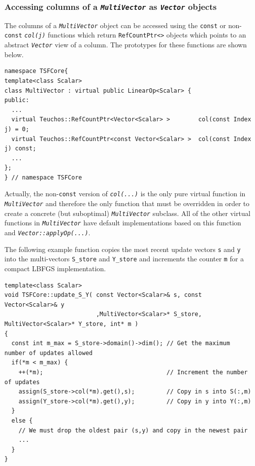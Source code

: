 %
\subsubsection{Accessing columns of a {}\texttt{\textit{Multi\-Vector}}
as {}\texttt{\textit{Vector}} objects}
%

The columns of a {}\texttt{\textit{Multi\-Vector}} object can be
accessed using the {}\texttt{const} or non-\texttt{const}
{}\texttt{\textit{col(j)}} functions which return
{}\texttt{RefCountPtr<>} objects which points to an abstract
{}\texttt{\textit{Vector}} view of a column.  The prototypes for these
functions are shown below.

{\scriptsize\begin{verbatim}
namespace TSFCore{
template<class Scalar>
class MultiVector : virtual public LinearOp<Scalar> {
public:
  ...
  virtual Teuchos::RefCountPtr<Vector<Scalar> >        col(const Index j) = 0;
  virtual Teuchos::RefCountPtr<const Vector<Scalar> >  col(const Index j) const;
  ...
};
} // namespace TSFCore
\end{verbatim}}

{}\noindent{}Actually, the non-\texttt{const} version of
{}\texttt{\textit{col(...)}}  is the only pure virtual function in
{}\texttt{\textit{Multi\-Vector}} and therefore the only function that
must be overridden in order to create a concrete (but suboptimal)
{}\texttt{\textit{Multi\-Vector}} subclass.  All of the other virtual
functions in {}\texttt{\textit{Multi\-Vector}} have default
implementations based on this function and
{}\texttt{\textit{Vector\-::applyOp(\-...)}}.

The following example function copies the most recent update vectors
{}\texttt{s} and {}\texttt{y} into the multi-vectors
{}\texttt{S\_store} and {}\texttt{Y\_store} and increments the counter
{}\texttt{m} for a compact LBFGS implementation.

{\scriptsize\begin{verbatim}
template<class Scalar>
void TSFCore::update_S_Y( const Vector<Scalar>& s, const Vector<Scalar>& y
                          ,MultiVector<Scalar>* S_store, MultiVector<Scalar>* Y_store, int* m )
{
  const int m_max = S_store->domain()->dim(); // Get the maximum number of updates allowed
  if(*m < m_max) {
    ++(*m);                                   // Increment the number of updates
    assign(S_store->col(*m).get(),s);         // Copy in s into S(:,m)         
    assign(Y_store->col(*m).get(),y);         // Copy in y into Y(:,m)
  }
  else {
    // We must drop the oldest pair (s,y) and copy in the newest pair
    ...
  }
}
\end{verbatim}}

